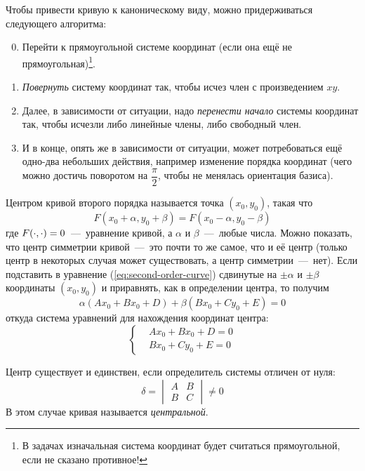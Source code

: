 \documentclass[a4paper,12pt]{article}
\begin{document}
  Чтобы привести кривую к каноническому виду, можно придерживаться следующего алгоритма:
  \begin{enumerate}
    \setcounter{enumi}{-1}
    \item Перейти к прямоугольной системе координат (если она ещё не прямоугольная)\footnote{В задачах изначальная система координат будет считаться прямоугольной, если не сказано противное!}.
    \item \emph{Повернуть} систему координат так, чтобы исчез член с произведением $xy$.
    \item Далее, в зависимости от ситуации, надо \emph{перенести начало} системы координат так, чтобы исчезли либо линейные члены, либо свободный член.
    \item И в конце, опять же в зависимости от ситуации, может потребоваться ещё одно-два небольших действия, например изменение порядка координат (чего можно достичь поворотом на $\dfrac{\pi}{2}$, чтобы не менялась ориентация базиса).
  \end{enumerate}
  
  Центром кривой второго порядка называется точка $(x_0, y_0)$, такая что
  \[
    F(x_0 + \alpha, y_0 + \beta) = F(x_0 - \alpha, y_0 - \beta)
  \]
  где $F(\cdot, \cdot) \hm= 0$~---~уравнение кривой, а $\alpha$ и $\beta$~---~любые числа.
  Можно показать, что центр симметрии кривой~---~это почти то же самое, что и её центр (только центр в некоторых случая может существовать, а центр симметрии~---~нет).
  Если подставить в уравнение (\ref{eq:second-order-curve}) сдвинутые на $\pm \alpha$ и $\pm \beta$ координаты $(x_0, y_0)$ и приравнять, как в определении центра, то получим
  \[
    \alpha (Ax_0 + Bx_0 + D) + \beta (Bx_0 + Cy_0 + E) = 0
  \]
  откуда система уравнений для нахождения координат центра:
  \begin{equation}\label{eq:second-order-curve-center}
    \left\{
      \begin{aligned}
        &Ax_0 + Bx_0 + D = 0\\
        &Bx_0 + Cy_0 + E = 0
      \end{aligned}
    \right.
  \end{equation}
  
  Центр существует и единствен, если определитель системы отличен от нуля:
  \[
    \delta = \begin{vmatrix}A & B \\ B & C\end{vmatrix} \not= 0
  \]
  В этом случае кривая называется \emph{центральной}.
  
\end{document}
